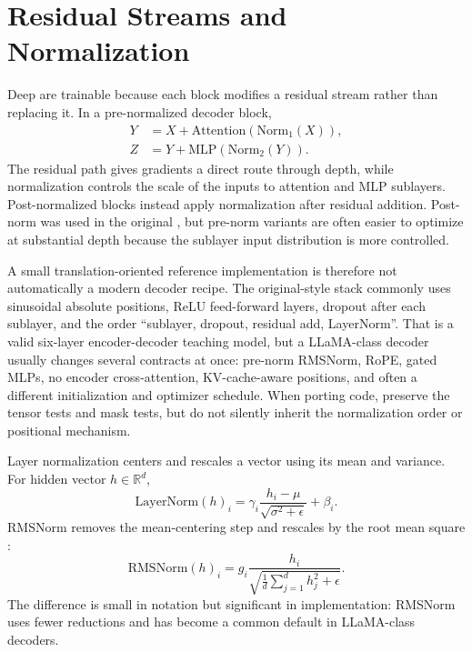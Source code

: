 \section{Residual Streams and Normalization}
\label{sec:residual-streams-normalization}

Deep \transformers are trainable because each block modifies a residual stream rather than replacing it. In a pre-normalized decoder block,
\begin{align}
  Y &= X + \mathrm{Attention}(\mathrm{Norm}_1(X)),\\
  Z &= Y + \mathrm{MLP}(\mathrm{Norm}_2(Y)).
\end{align}
The residual path gives gradients a direct route through depth, while normalization controls the scale of the inputs to attention and MLP sublayers. Post-normalized blocks instead apply normalization after residual addition. Post-norm was used in the original \transformer, but pre-norm variants are often easier to optimize at substantial depth because the sublayer input distribution is more controlled.

A small translation-oriented reference implementation is therefore not automatically a modern decoder recipe. The original-style stack commonly uses sinusoidal absolute positions, ReLU feed-forward layers, dropout after each sublayer, and the order ``sublayer, dropout, residual add, LayerNorm''. That is a valid six-layer encoder-decoder teaching model, but a LLaMA-class decoder usually changes several contracts at once: pre-norm RMSNorm, RoPE, gated MLPs, no encoder cross-attention, KV-cache-aware positions, and often a different initialization and optimizer schedule. When porting code, preserve the tensor tests and mask tests, but do not silently inherit the normalization order or positional mechanism.

Layer normalization centers and rescales a vector using its mean and variance. For hidden vector $h\in\mathbb{R}^{d}$,
\begin{equation}
  {\mathrm{LayerNorm}(h)}_i =
  \gamma_i \frac{h_i-\mu}{\sqrt{\sigma^2+\epsilon}} + \beta_i.
\end{equation}
RMSNorm removes the mean-centering step and rescales by the root mean square \cite{zhang2019root}:
\begin{equation}
  {\mathrm{RMSNorm}(h)}_i =
  g_i \frac{h_i}{\sqrt{\frac{1}{d}\sum_{j=1}^{d}h_j^2+\epsilon}}.
\end{equation}
The difference is small in notation but significant in implementation: RMSNorm uses fewer reductions and has become a common default in LLaMA-class decoders.

